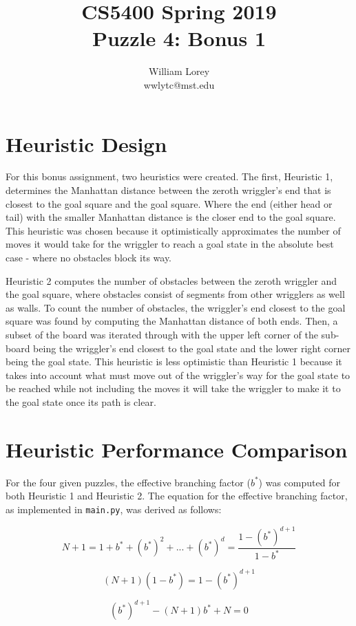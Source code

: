 \documentclass[11pt]{article}
\title{CS5400 Spring 2019 \\ Puzzle 4: Bonus 1}
\author{William  Lorey \\ wwlytc@mst.edu}
\date{}
\begin{document}
\maketitle

\tableofcontents

\section{Heuristic Design}

For this bonus assignment, two heuristics were created. The first, Heuristic 1, determines the Manhattan distance
between the zeroth wriggler's end that is closest to the goal square and the goal square. Where the end (either 
head or tail) with the smaller Manhattan distance
is the closer end to the goal square. This heuristic was chosen because it optimistically approximates the number of moves
it would take for the wriggler to reach a goal state in the absolute best case - where no obstacles block its way.

Heuristic 2 computes the number of obstacles between the zeroth wriggler and the goal square, where obstacles consist of
segments from other wrigglers as well as walls. To count the number of obstacles, the wriggler's end closest to the goal square was found
by computing the Manhattan distance of both ends. Then, a subset of the board was iterated through with the upper left corner of the sub-board
being the wriggler's end closest to the goal state and the lower right corner being the goal state. This heuristic is less optimistic
than Heuristic 1 because it takes into account what must move out of the wriggler's way for the goal state to be reached while not
including the moves it will take the wriggler to make it to the goal state once its path is clear.

\section{Heuristic Performance Comparison}

For the four given puzzles, the effective branching factor ($ b^* $) was computed for both Heuristic 1 and Heuristic 2.
The equation for the effective branching factor, as implemented in \texttt{main.py}, was derived as follows:

\[ N + 1 = 1 + b^* + (b^*)^2 + ... + (b^*)^d = \frac{1 - (b^*)^{d + 1}}{1 - b^*} \]

\[ (N + 1)(1 - b^*) = 1 - (b^*)^{d + 1} \]

\[ (b^*)^{d + 1} - (N + 1)b^* + N = 0 \]
\end{document}
